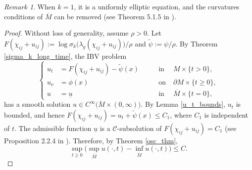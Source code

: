 \documentclass[12pt]{amsart}
\theoremstyle{definition}
\theoremstyle{remark}
\newtheorem{remark}[theorem]{Remark}
\numberwithin{equation}{section}
\begin{document}
\begin{remark}
	When $k=1$, it is a uniformly elliptic equation, and the curvatures conditions of $\overline{M}$ can be removed (see Theorem 5.1.5 in \cite{GuoThesis19}).
\end{remark}

\begin{proof}
	Without loss of generality, assume $\rho > 0$.
	Let $F(\chi_{ij} + u_{ij}) := \log \sigma_k\big(\lambda_g(\chi_{ij} + u_{ij})\big) / \rho$ and $\tilde{\psi} := \psi / \rho$.
	By Theorem \ref{sigma_k_long_time}, the IBV problem
	\begin{equation}
	\left\{
	\begin{aligned}
	u_t &= F(\chi_{ij} + u_{ij}) - \tilde{\psi}(x) \qquad &\text{in}&\; M \times \{t>0\}, \\ 
	u_\nu &= \phi(x) \qquad &\text{on}& \; \partial M \times \{t \geq 0\},\\
	u  &= \underline{u} \qquad & \text{in}& \; \overline{M}\times\{t = 0\},
	\end{aligned}
	\right.
	\end{equation}
	has a smooth solution $u \in C^{\infty}\big(\overline{M}\times (0, \infty)\big)$. By Lemma \ref{u_t_bounds}, $u_t$ is bounded, and hence $F(\chi_{ij} + u_{ij}) = u_t + \tilde{\psi}(x) \leq C_1$, where $C_1$ is independent of $t$. The admissible function $\underline{u}$ is a $\mathcal{C}$-subsolution of $F(\chi_{ij} + u_{ij}) = C_1$ (see Proposition 2.2.4 in \cite{GuoThesis19}). Therefore, by Theorem \ref{osc_thm}, 
	\begin{equation}\label{unif_conv_osc}
	\sup_{t\geq 0} \Big(\sup_{\overline{M}} u(\cdot, t) - \inf_{\overline{M}} u(\cdot, t)\Big) \leq C.
	\end{equation}
	

\end{proof}
\end{document}
